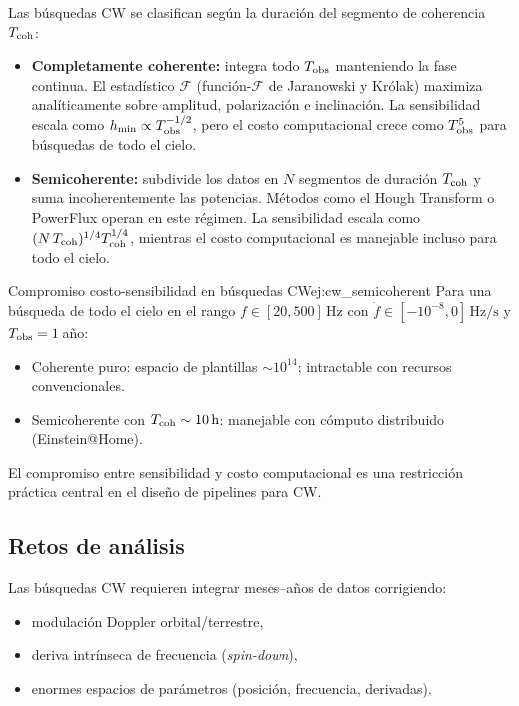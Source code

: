 Las búsquedas CW se clasifican según la duración del segmento de coherencia $T_{\rm coh}$:

\begin{itemize}[leftmargin=2em]
  \item \textbf{Completamente coherente:} integra todo $T_{\rm obs}$ manteniendo la fase continua. El estadístico $\mathcal{F}$ (función-$\mathcal{F}$ de Jaranowski y Królak) maximiza analíticamente sobre amplitud, polarización e inclinación. La sensibilidad escala como $h_{\rm min}\propto T_{\rm obs}^{-1/2}$, pero el costo computacional crece como $T_{\rm obs}^5$ para búsquedas de todo el cielo.
  \item \textbf{Semicoherente:} subdivide los datos en $N$ segmentos de duración $T_{\rm coh}$ y suma incoherentemente las potencias. Métodos como el Hough Transform o PowerFlux operan en este régimen. La sensibilidad escala como $(N\,T_{\rm coh})^{1/4}T_{\rm coh}^{1/4}$, mientras el costo computacional es manejable incluso para todo el cielo.
\end{itemize}

\begin{ejemplo}{Compromiso costo-sensibilidad en búsquedas CW}{ej:cw_semicoherent}
Para una búsqueda de todo el cielo en el rango $f\in[20,500]\,\mathrm{Hz}$ con $\dot f\in[-10^{-8},0]\,\mathrm{Hz/s}$ y $T_{\rm obs}=1$\,año:
\begin{itemize}[leftmargin=2em]
  \item Coherente puro: espacio de plantillas $\sim 10^{14}$; intractable con recursos convencionales.
  \item Semicoherente con $T_{\rm coh}\sim 10\,\mathrm{h}$: manejable con cómputo distribuido (Einstein@Home).
\end{itemize}
El compromiso entre sensibilidad y costo computacional es una restricción práctica central en el diseño de pipelines para CW.
\end{ejemplo}

\subsection{Retos de análisis}

Las búsquedas CW requieren integrar meses--años de datos corrigiendo:
\begin{itemize}[leftmargin=2em]
  \item modulación Doppler orbital/terrestre,
  \item deriva intrínseca de frecuencia (\emph{spin-down}),
  \item enormes espacios de parámetros (posición, frecuencia, derivadas).
\end{itemize}

